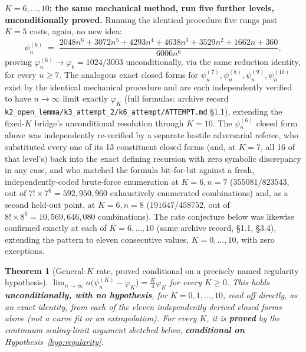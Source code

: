 \documentclass[11pt]{article}
\newtheorem{theorem}{Theorem}
\theoremstyle{remark}
\begin{document}
\textbf{$K=6,\dots,10$: the same mechanical method, run five further
levels, unconditionally proved.} Running the identical procedure five
rungs past $K=5$ costs, again, no new idea:
\[
  \psi_n^{(6)} \;=\; \frac{2048n^6+3072n^5+4293n^4+4638n^3+3529n^2+1662n+360}{6006n^6},
\]
proving $\varphi_n^{(6)}\to\varphi_6=1024/3003$ unconditionally, via the
same reduction identity, for every $n\ge7$. The analogous exact closed
forms for $\psi_n^{(7)},\psi_n^{(8)},\psi_n^{(9)},\psi_n^{(10)}$ exist by
the identical mechanical procedure and are each independently verified
to have $n\to\infty$ limit exactly $\varphi_K$ (full formulas: archive
record \texttt{k2\_open\_lemma/k3\_attempt\_2/k6\_attempt/ATTEMPT.md}
\S1.1), extending the fixed-$K$ bridge's unconditional resolution through
$K=10$. The $\psi_n^{(6)}$ closed form above was independently
re-verified by a separate hostile adversarial referee, who substituted
every one of its 13 constituent closed forms (and, at $K=7$, all 16 of
that level's) back into the exact defining recursion with zero symbolic
discrepancy in any case, and who matched the formula bit-for-bit against
a fresh, independently-coded brute-force enumeration at $K=6,n=7$
($355081/823543$, out of $7!\times7^6=592{,}950{,}960$ exhaustively
enumerated combinations) and, as a second held-out point, at $K=6,n=8$
($191647/458752$, out of $8!\times8^6=10{,}569{,}646{,}080$
combinations). The rate conjecture below was likewise confirmed exactly
at each of $K=6,\dots,10$ (same archive record, \S1.1, \S3.4), extending
the pattern to eleven consecutive values, $K=0,\dots,10$, with zero
exceptions.

\begin{theorem}[General-$K$ rate, proved conditional on a precisely named regularity hypothesis]
\label{thm:rate}
$\displaystyle\lim_{n\to\infty} n\big(\psi_n^{(K)}-\varphi_K\big) = \frac{K}{4}\varphi_K$
for every $K\ge0$. This holds \textbf{unconditionally, with no
hypothesis}, for $K=0,1,\dots,10$, read off directly, as an exact
identity, from each of the eleven independently derived closed forms
above (not a curve fit or an extrapolation). For \emph{every} $K$, it is
\textbf{proved} by the continuum scaling-limit argument sketched below,
\textbf{conditional on} Hypothesis~\ref{hyp:regularity}.
\end{theorem}
\end{document}
